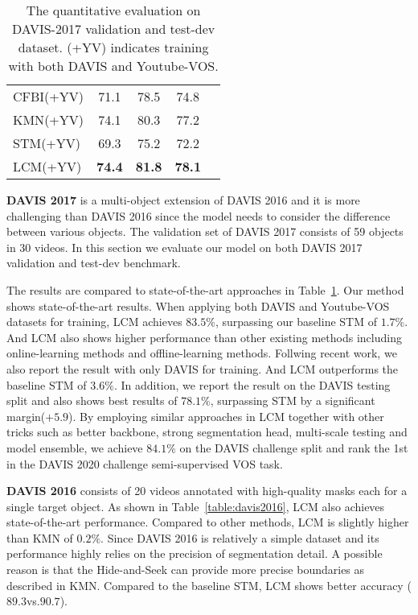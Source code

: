 \documentclass[final]{cvpr}
\begin{document}
\begin{table}
\begin{center}
\begin{tabular}{lcccc}
CFBI\cite{cfbi}(+YV)  & 71.1 &  78.5 &  74.8 \\
KMN\cite{KMN}(+YV)     &  74.1 & 80.3 & 77.2 \\


\hline
STM\cite{STM}(+YV)  &  69.3  &  75.2 & 72.2  \\
LCM(+YV)      & \textbf{74.4} &  \textbf{81.8} &  \textbf{78.1} \\
\hline
\end{tabular}
\end{center} 	\caption{The quantitative evaluation on DAVIS-2017 validation and test-dev dataset. (+YV) indicates training with both DAVIS and Youtube-VOS.  }
	\label{table:davis2017}
\end{table}


\textbf{DAVIS 2017}\cite{davis2017} is a multi-object extension of DAVIS 2016 and it is more challenging than DAVIS 2016 since the model needs to consider the difference between various objects. The validation set of DAVIS 2017 consists of 59 objects in 30 videos. In this section we evaluate our model on both DAVIS 2017 validation and test-dev benchmark. 

The results are compared to state-of-the-art approaches in Table~\ref{table:davis2017}. 
Our method shows state-of-the-art results. When applying both DAVIS and Youtube-VOS datasets for training, LCM achieves $83.5\%$, surpassing our baseline STM of $1.7\%$. And LCM also shows higher performance than other existing methods including online-learning methods and offline-learning methods. Follwing recent work, we also report the result with only DAVIS for training. And LCM outperforms the baseline STM of $3.6\%$.
In addition, we report the result on the DAVIS testing split and also shows best results of $78.1\%$, surpassing STM by a significant margin($+5.9$). By employing similar approaches in LCM together with other tricks such as better backbone, strong segmentation head, multi-scale testing and model ensemble, we achieve $84.1\%$ on the DAVIS challenge split and rank the 1st in the DAVIS 2020 challenge semi-supervised VOS task.




\textbf{DAVIS 2016}\cite{davis2016} consists of 20 videos annotated with high-quality masks each for a single target object. As shown in Table~\ref{table:davis2016}, LCM also achieves state-of-the-art performance. Compared to other methods, LCM is slightly higher than KMN of $0.2\%$. Since DAVIS 2016 is relatively a simple dataset and its performance highly relies on the precision of segmentation detail. A possible reason is that the Hide-and-Seek can provide more precise boundaries as described in KMN. Compared to the baseline STM, LCM shows better accuracy ($89.3$vs.$90.7$).
\end{document}
